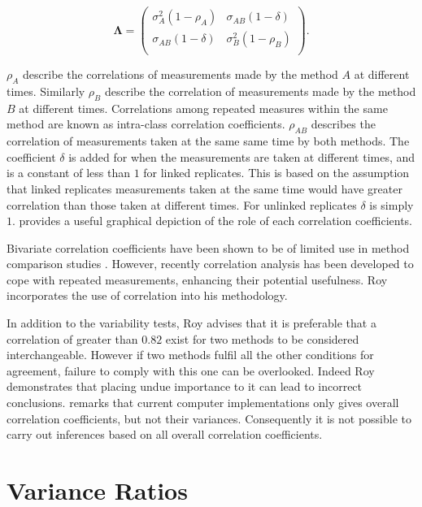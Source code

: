 \documentclass[12pt, a4paper]{report}
\theoremstyle{plain}
\theoremstyle{definition}
\theoremstyle{remark}
\begin{document}
\[
\boldsymbol{\Lambda} = \left(
\begin{array}{cc}
\sigma^2_{A}(1-\rho_{A}) & \sigma_{AB}(1-\delta)  \\
\sigma_{AB}(1-\delta) & \sigma^2_{B}(1-\rho_{B}) \\
\end{array}\right).
\]

$\rho_{A}$ describe the correlations of measurements made by the method $A$ at different times. Similarly $\rho_{B}$ describe the correlation of measurements made by the method $B$ at different times. Correlations among repeated measures within the same method are known as intra-class correlation coefficients. $\rho_{AB}$ describes the correlation of measurements taken at the same same time by both methods. The coefficient $\delta$ is added for when the measurements are taken at different times, and is a constant of less than $1$ for linked replicates. This is based on the assumption that linked replicates measurements taken at the same time would have greater correlation than those taken at different times. For unlinked replicates $\delta$ is simply $1$. \citet{hamlett} provides a useful graphical depiction of the role of each correlation coefficients.



Bivariate correlation coefficients have been shown to be of
limited use in method comparison studies \citep{BA86}. However,
recently correlation analysis has been developed to cope with
repeated measurements, enhancing their potential usefulness. Roy
incorporates the use of correlation into his methodology.


In addition to the variability tests, Roy advises that it is preferable that a correlation of greater than $0.82$ exist for two methods to be considered interchangeable. However if two methods fulfil all the other conditions for agreement, failure to comply with this one can be overlooked. Indeed Roy demonstrates that placing undue importance to it can lead to incorrect conclusions. \citet{ARoy2009} remarks that current computer implementations only gives overall correlation coefficients, but not their variances. Consequently it is not possible to carry out inferences based on all overall correlation coefficients.


\section{Variance Ratios}
\end{document}

